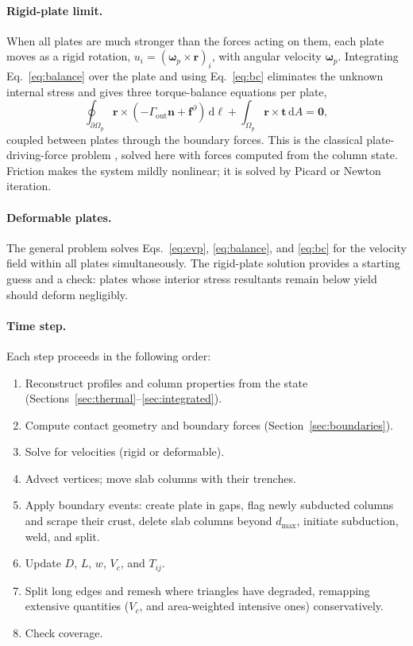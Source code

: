 \documentclass[11pt]{article}
\newcommand{\dd}{\,\mathrm{d}}
\begin{document}
\paragraph{Rigid-plate limit.}
When all plates are much stronger than the forces acting on them, each plate
moves as a rigid rotation, $u_i = (\boldsymbol\omega_p\times\mathbf{r})_i$, with
angular velocity $\boldsymbol\omega_p$. Integrating Eq.~\eqref{eq:balance} over
the plate and using Eq.~\eqref{eq:bc} eliminates the unknown internal stress and
gives three torque-balance equations per plate,
\begin{equation}
  \oint_{\partial\Omega_p}\mathbf{r}\times\left(-\Gamma_{\mathrm{out}}\mathbf{n}
  + \mathbf{f}^{\partial}\right)\dd\ell
  + \int_{\Omega_p}\mathbf{r}\times\mathbf{t}\dd A = \mathbf{0},
  \label{eq:torque}
\end{equation}
coupled between plates through the boundary forces. This is the classical
plate-driving-force problem \cite{ForsythUyeda1975}, solved here with forces
computed from the column state. Friction makes the system mildly nonlinear; it
is solved by Picard or Newton iteration.

\paragraph{Deformable plates.}
The general problem solves Eqs.~\eqref{eq:evp}, \eqref{eq:balance}, and
\eqref{eq:bc} for the velocity field within all plates simultaneously. The
rigid-plate solution provides a starting guess and a check: plates whose
interior stress resultants remain below yield should deform negligibly.

\paragraph{Time step.}
Each step proceeds in the following order:
\begin{enumerate}
  \item Reconstruct profiles and column properties from the state
        (Sections~\ref{sec:thermal}--\ref{sec:integrated}).
  \item Compute contact geometry and boundary forces
        (Section~\ref{sec:boundaries}).
  \item Solve for velocities (rigid or deformable).
  \item Advect vertices; move slab columns with their trenches.
  \item Apply boundary events: create plate in gaps, flag newly subducted
        columns and scrape their crust, delete slab columns beyond
        $d_{\max}$, initiate subduction, weld, and split.
  \item Update $D$, $L$, $w$, $V_c$, and $T_{ij}$.
  \item Split long edges and remesh where triangles have degraded, remapping
        extensive quantities ($V_c$, and area-weighted intensive ones)
        conservatively.
  \item Check coverage.
\end{enumerate}
\end{document}
